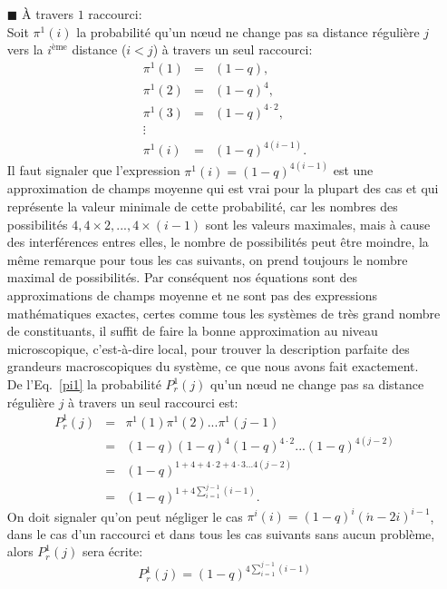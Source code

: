 \begin{itemize}
\item[$\blacksquare$]  \`{A} travers $1$ raccourci:\\
Soit $\pi^1(i)$ la probabilité qu'un nœud ne change pas sa distance régulière $j$ vers
la $i^{\text{ème}}$ distance ($i<j$) à travers un seul raccourci:
\begin{eqnarray}\nonumber
	\pi^1(1)&=&(1-q), \\\nonumber
	\pi^1(2)&=&(1-q)^4,\\\nonumber
	\pi^1(3)&=&(1-q)^{4\cdot2},\\\nonumber
	\vdots\\
	\pi^1(i)&=&(1-q)^{4(i-1)}.
	\label{pi1}
	\end{eqnarray}
	Il faut signaler que l'expression $\pi^1(i)=(1-q)^{4(i-1)}$ est une approximation de champs moyenne qui est vrai pour la plupart des cas et qui représente la valeur minimale de cette probabilité, car les nombres des possibilités
	$4,4\times2,...,4\times(i-1)$ sont les valeurs maximales, mais à cause des interférences entres elles, le nombre de possibilités peut être moindre, la m\^{e}me remarque pour tous les cas 
	suivants, on prend toujours le nombre maximal de possibilités. Par conséquent nos équations sont des approximations de champs moyenne et ne sont pas des expressions 
	mathématiques exactes, certes comme tous les systèmes de très grand nombre de constituants, il suffit de faire la bonne 
	approximation au niveau microscopique, c'est-à-dire local, pour trouver la description parfaite des grandeurs macroscopiques du système, ce que nous
	avons fait exactement.\\
	De l'Eq.~\eqref{pi1} la probabilité $P^1_r(j)$ qu'un nœud ne change pas sa distance régulière $j$ à travers un seul raccourci est:
	\begin{eqnarray}\nonumber
	P_r^1(j)&=&\pi^1(1)\pi^1(2)...\pi^1(j-1)\\\nonumber
	&=& (1-q)(1-q)^4(1-q)^{4\cdot2}...(1-q)^{4(j-2)}\\\nonumber
	&=&(1-q)^{1+4+4\cdot2+4\cdot3...4(j-2)}\\\nonumber
	&=&(1-q)^{1+4\sum_{i=1}^{j-1}(i-1)}.
	\end{eqnarray}
	On doit signaler qu'on peut négliger le cas $\pi^i(i)=(1-q)^{i}(\acute{n}-2i)^{i-1}$,  dans le cas d'un raccourci et dans tous les cas suivants sans aucun problème, alors $P_r^1(j)$ sera écrite:
	$$P_r^1(j)=(1-q)^{4\sum_{i=1}^{j-1}(i-1)}$$
	

\end{itemize}
